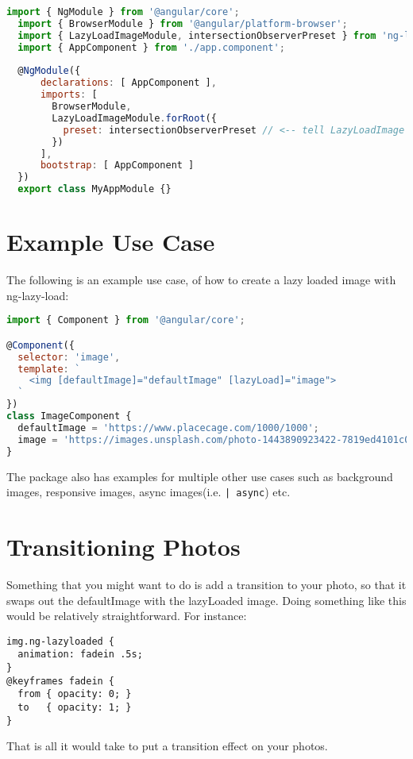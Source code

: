 
\begin{lstlisting}[language=javascript]
  import { NgModule } from '@angular/core';
  import { BrowserModule } from '@angular/platform-browser';
  import { LazyLoadImageModule, intersectionObserverPreset } from 'ng-lazyload-image'; // <-- include intersectionObserverPreset
  import { AppComponent } from './app.component';
  
  @NgModule({
      declarations: [ AppComponent ],
      imports: [
        BrowserModule,
        LazyLoadImageModule.forRoot({
          preset: intersectionObserverPreset // <-- tell LazyLoadImage that you want to use IntersectionObserver
        })
      ],
      bootstrap: [ AppComponent ]
  })
  export class MyAppModule {}
\end{lstlisting}

\section{Example Use Case}
The following is an example use case, of how to create a lazy loaded image 
with ng-lazy-load: 
\begin{lstlisting}[language=javascript]
import { Component } from '@angular/core';

@Component({
  selector: 'image',
  template: `
    <img [defaultImage]="defaultImage" [lazyLoad]="image">
  `
})
class ImageComponent {
  defaultImage = 'https://www.placecage.com/1000/1000';
  image = 'https://images.unsplash.com/photo-1443890923422-7819ed4101c0?fm=jpg';
}
\end{lstlisting}

The package also has examples for multiple other use cases such as background 
images, responsive images, async images(i.e. \lstinline{| async}) etc. 

\section{Transitioning Photos}
Something that you might want to do is add a transition to your photo, so that 
it swaps out the defaultImage with the lazyLoaded image. Doing something like 
this would be relatively straightforward. For instance: 
\begin{lstlisting}
img.ng-lazyloaded {
  animation: fadein .5s;
}
@keyframes fadein {
  from { opacity: 0; }
  to   { opacity: 1; }
}  
\end{lstlisting}

That is all it would take to put a transition effect on your photos.